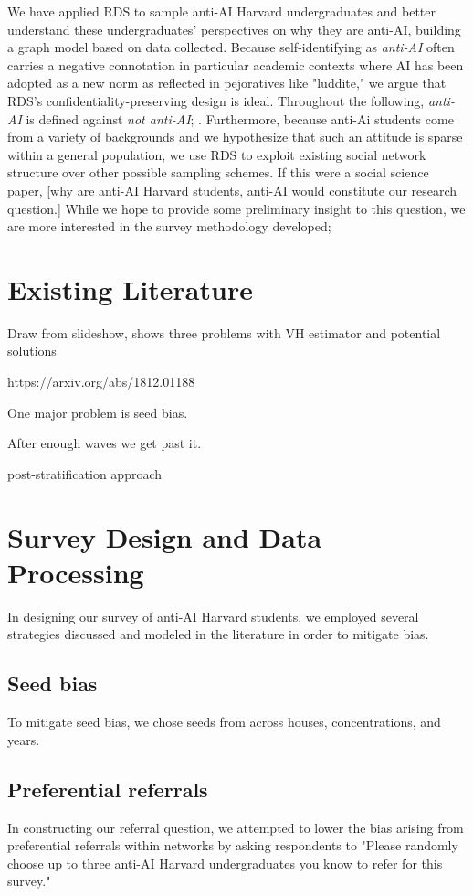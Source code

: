 \documentclass[12pt]{article}
\begin{document}
We have applied RDS to sample anti-AI Harvard undergraduates and better understand these undergraduates' perspectives on why they are anti-AI, building a graph model based on  data collected. Because self-identifying as \textit{anti-AI} often carries a negative connotation in particular academic contexts where AI has been adopted as a new norm as reflected in pejoratives like "luddite," we argue that RDS's confidentiality-preserving design is ideal. Throughout the following, \textit{anti-AI} is defined against \textit{not anti-AI}; . Furthermore, because anti-Ai students come from a variety of backgrounds and we hypothesize that such an attitude is sparse within a general population, we use RDS to exploit existing social network structure over other possible sampling schemes. If this were a social science paper, [why are anti-AI Harvard students, anti-AI would constitute our research question.] While we hope to provide some preliminary insight to this question, we are more interested in the survey methodology developed; 



\section{Existing Literature}

Draw from slideshow, shows three problems with VH estimator and potential solutions

https://arxiv.org/abs/1812.01188

One major problem is seed bias.

After enough waves we get past it.

post-stratification approach 




\section{Survey Design and Data Processing}

In designing our survey of anti-AI Harvard students, we employed several strategies discussed and modeled in the literature in order to mitigate bias. 
\subsection{Seed bias}
To mitigate seed bias, we chose seeds from across houses, concentrations, and years.

\subsection{Preferential referrals}
In constructing our referral question, we attempted to lower the bias arising from preferential referrals within networks by asking respondents to "Please randomly choose up to three anti-AI Harvard undergraduates you know to refer for this survey."
\end{document}
